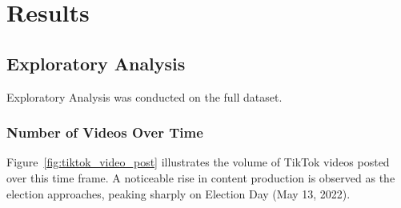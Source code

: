 \documentclass[12pt,a4paper]{report}
\begin{document}
\chapter{Results}
\section{Exploratory Analysis}
Exploratory Analysis was conducted on the full dataset.



\subsection{Number of Videos Over Time}
Figure~\ref{fig:tiktok_video_post} illustrates the volume of TikTok videos posted over this time frame. A noticeable rise in content production is observed as the election approaches, peaking sharply on Election Day (May 13, 2022).
\end{document}
